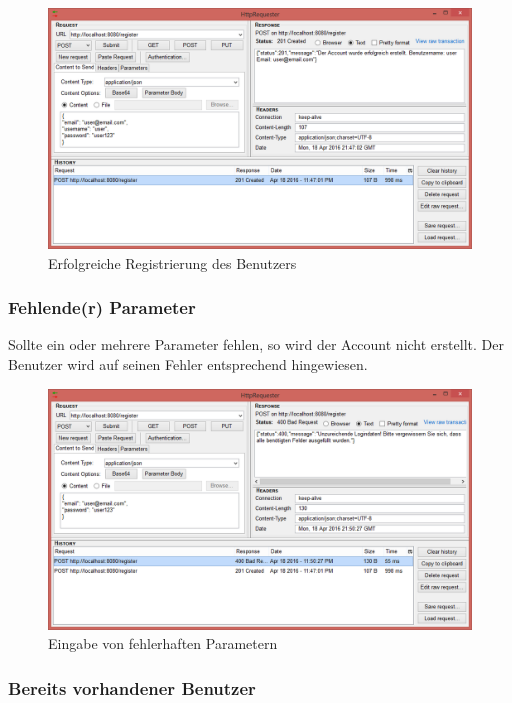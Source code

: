 \begin{figure}[H]
	\includegraphics[width=1\textwidth]{images/register_ok.png}
	\caption{Erfolgreiche Registrierung des Benutzers}
\end{figure} 
\clearpage

\subsubsection{Fehlende(r) Parameter}

Sollte ein oder mehrere Parameter fehlen, so wird der Account nicht erstellt. Der Benutzer wird auf seinen Fehler entsprechend hingewiesen.

\begin{figure}[H]
	\includegraphics[width=1\textwidth]{images/register_param_missing.png}
	\caption{Eingabe von fehlerhaften Parametern}
\end{figure}
\clearpage

\subsubsection{Bereits vorhandener Benutzer}

